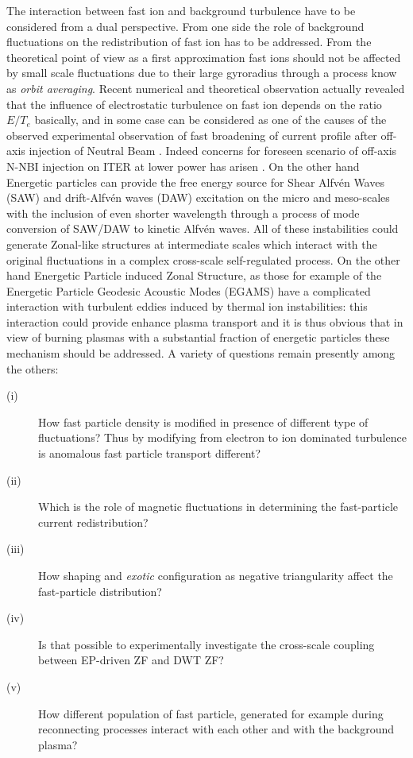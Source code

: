 \documentclass[12pt,a4paper]{article}
\begin{document}
The interaction between fast ion and background turbulence have to be
considered from a dual perspective. 
From one side the role of background fluctuations on the
redistribution of fast ion has to be addressed. From the theoretical
point of view as a first approximation fast ions should not be
affected by small scale fluctuations due to their large gyroradius
through a process know as \emph{orbit averaging}. Recent numerical and
theoretical observation \cite{Albergante:2011bj} actually revealed
that the influence of electrostatic turbulence on fast ion depends on the ratio
$E/T_e$ basically,  and in some case can be considered as one of the causes of
the observed experimental observation of fast broadening of current profile after
off-axis injection of Neutral Beam
\cite{Heidbrink:2009wv,Baranov:2009p4033}. Indeed concerns for
foreseen scenario of off-axis N-NBI injection on ITER at lower power
has arisen \cite{Albergante:2011bj}. On the other hand Energetic
particles can provide the free energy source for Shear Alfv{\'e}n
Waves (SAW) and drift-Alfv{\'e}n waves (DAW) excitation on the micro and
meso-scales \cite{Zonca:2015hs} with the inclusion of even shorter
wavelength through a process of mode conversion of SAW/DAW to kinetic
Alfv{\'e}n waves. All of these instabilities could generate Zonal-like
structures at intermediate scales which interact with the original
fluctuations in a complex cross-scale self-regulated process. On the
other hand Energetic Particle induced Zonal Structure, as those for
example of the Energetic Particle Geodesic Acoustic Modes (EGAMS)
\cite{Zarzoso:2013kw,Nazikian:2008hk,Ido:2011gy} have a complicated
interaction with turbulent eddies induced by thermal ion
instabilities: this interaction could provide enhance plasma transport
and it is thus obvious that in view of burning plasmas with a
substantial fraction of energetic particles these mechanism should be
addressed. A variety of questions remain presently among the others:
\begin{description}
\item[(i)] How fast particle density is modified in presence of
  different type of fluctuations? Thus by modifying from electron to
  ion dominated turbulence is anomalous fast particle transport different?
\item[(ii)] Which is the role of magnetic fluctuations in determining
  the fast-particle current redistribution?
\item[(iii)] How shaping and \emph{exotic} configuration as negative
  triangularity affect the fast-particle distribution?
\item[(iv)] Is that possible to experimentally investigate the
  cross-scale coupling between EP-driven ZF and DWT ZF?
\item[(v)] How different population of fast particle, generated for
  example during reconnecting processes interact with each other and
  with the background plasma?
\end{description}
\end{document}
